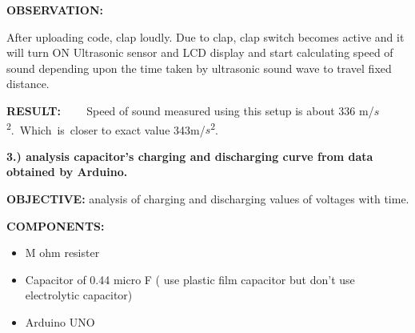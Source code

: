 \documentclass[12pt]{article}
\begin{document}
\vspace{\baselineskip}
{\fontsize{14pt}{16.8pt}\selectfont \textbf{OBSERVATION:}\par}\par

\vspace{\baselineskip}
{\fontsize{14pt}{16.8pt}\selectfont After uploading code, clap loudly. Due to clap, clap switch becomes active and it will turn ON Ultrasonic sensor and LCD display and start calculating speed of sound depending upon the time taken by ultrasonic sound wave to travel fixed distance.\par}\par

\vspace{\baselineskip}
{\fontsize{14pt}{16.8pt}\selectfont \textbf{RESULT:\ \ \ \  }Speed of sound measured using this setup is about 336 m/$s$\textsuperscript{2}.\ Which\ is\    closer to exact value 343m/$s$\textsuperscript{2}.\par}\par

\vspace{\baselineskip}
{\fontsize{14pt}{16.8pt}\selectfont \textbf{3.) analysis capacitor’s charging and discharging curve from data obtained by Arduino.}\par}\par

\vspace{\baselineskip}
{\fontsize{14pt}{16.8pt}\selectfont \textbf{OBJECTIVE: }analysis of charging and discharging values of voltages with time.\par}\par

\vspace{\baselineskip}
{\fontsize{14pt}{16.8pt}\selectfont \textbf{COMPONENTS:\ \  }\par}\par

\begin{itemize}
	\item {\fontsize{14pt}{16.8pt} M ohm resister\par}\par

	\item {\fontsize{14pt}{16.8pt}\selectfont Capacitor of 0.44 micro F ( use plastic film capacitor but don’t use electrolytic capacitor)\par}\par

	\item {\fontsize{14pt}{16.8pt}\selectfont Arduino UNO\par}
\end{itemize}\par
\end{document}
